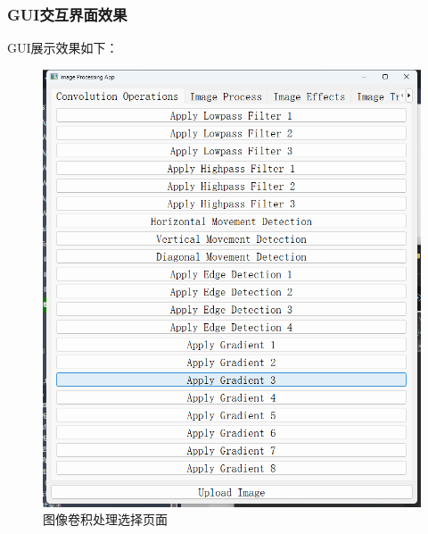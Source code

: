 \documentclass[a4paper,12pt]{article}
\begin{document}
\subsubsection{GUI交互界面效果}
GUI展示效果如下：
\begin{figure}[htbp]
    \centering
    \begin{minipage}[b]{0.48\textwidth}
        \centering
        \includegraphics[width=\linewidth]{images/Design/image_processing/GUI/1.png}
        \caption{图像卷积处理选择页面}
    \end{minipage}
    \hfill
    \begin{minipage}[b]{0.48\textwidth}
        \centering

\end{minipage}
\end{figure}
\end{document}
